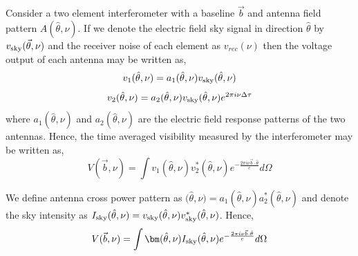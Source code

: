 \documentclass[iop]{emulateapj}
\newcommand{\volt}{{v}}
\newcommand{\vis}{{V}}
\newcommand{\sky}{{\rm sky}}
\newcommand{\bmvolt}{{a}}
\newcommand{\thhat}{{\hat\theta}}
\newcommand{\ifngexp}{{e^{-\frac{2\pi i\nu\vec{b}\cdot\thhat}{c}}}}
\newcommand{\dfngexp}{{e^{2\pi i\nu \Delta \tau}}}
\begin{document}
Consider a two element interferometer with a baseline $\vec b$ and antenna field pattern $A(\thhat, \nu)$. If we denote the electric field sky signal in direction $\thhat$ by $\volt_\sky(\vec \theta, \nu)$ and the receiver noise of each element as $\volt_{rec}(\nu)$ then the voltage output of each antenna may be written as,  
\begin{equation}
\volt_{1}(\thhat, \nu) = \bmvolt_{1}(\thhat,\nu)\volt_\sky(\thhat,\nu)\nonumber\\
\end{equation}
\begin{equation}
\volt_{2} (\thhat, \nu)= \bmvolt_{2}(\thhat,\nu)\volt_\sky(\thhat,\nu)\dfngexp\nonumber\\
\end{equation}
where $\bmvolt_{1}(\thhat,\nu)$ and $\bmvolt_{2}(\thhat,\nu)$ are the electric field response patterns 
of the two antennas.
Hence, the time averaged visibility measured by the interferometer may be written as, 
\begin{equation}
\vis(\vec b, \nu) =  \int  \volt_{1}(\thhat,\nu)  \volt_{2}^{*} (\thhat, \nu) \ifngexp d\Omega 
\label{eq1}
\end{equation}

We define antenna cross power pattern as  $\bm(\thhat,\nu)=\bmvolt_{1}(\thhat,\nu)\bmvolt_{2}^{*}(\thhat,\nu)$ and denote the sky intensity as  $I_\sky(\thhat,\nu)=\volt_\sky(\thhat,\nu)\volt_\sky^{*}(\thhat,\nu)$. Hence, 
\begin{equation}
\vis(\vec b,\nu) = \int \bm(\thhat, \nu) I_\sky(\thhat,\nu) \ifngexp d\Omega
\label{eq2}
\end{equation}
\end{document}
